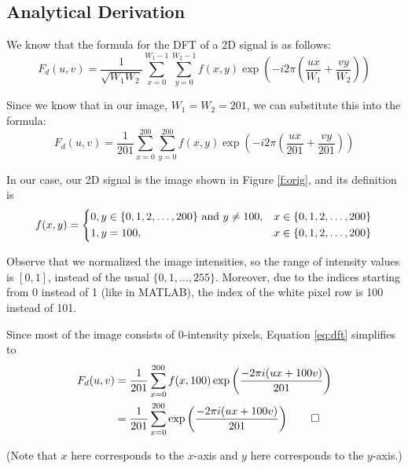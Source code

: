 \documentclass[a4paper]{article}
\begin{document}
\subsection{Analytical Derivation}

We know that the formula for the DFT of a 2D signal is as follows:
\begin{equation*}
F_d(u, v) = \dfrac{1}{\sqrt{W_1W_2}} \sum\limits_{x = 0}^{W_1 - 1} \sum\limits_{y = 0}^{W_2 - 1} f(x, y) \exp\left (-i2\pi \left (\dfrac{ux}{W_1} + \dfrac{vy}{W_2}\right )\right )
\end{equation*}

Since we know that in our image, $W_1 = W_2 = 201$, we can substitute this into the formula:
\begin{equation}
F_d(u, v) = \dfrac{1}{201} \sum\limits_{x = 0}^{200} \sum\limits_{y = 0}^{200} f(x, y) \exp\left (-i2\pi \left (\dfrac{ux}{201} + \dfrac{vy}{201}\right )\right )
\label{eq:dft}
\end{equation}

In our case, our 2D signal is the image shown in Figure \ref{f:orig}, and its definition is
\begin{equation*}
f(x, y) =
\begin{dcases}
0, y \in \{0, 1, 2, \dots, 200\} \text{ and } y \ne 100, & x \in \{0, 1, 2, \dots, 200\} \\
1, y = 100, & x \in \{0, 1, 2, \dots, 200\}
\end{dcases}
\end{equation*}

Observe that we normalized the image intensities, so the range of intensity values is $[0, 1]$, instead of the usual $\{0, 1, \dots, 255\}$. Moreover, due to the indices starting from 0 instead of 1 (like in MATLAB), the index of the white pixel row is 100 instead of 101.

\medskip

Since most of the image consists of 0-intensity pixels, Equation \eqref{eq:dft} simplifies to
\begin{align}
F_d(u, v) &= \dfrac{1}{201} \sum\limits_{x = 0}^{200} f(x, 100) \exp\left (\dfrac{-2\pi i(ux + 100v)}{201}\right ) \nonumber \\
&= \dfrac{1}{201} \sum\limits_{x = 0}^{200} \exp\left (\dfrac{-2\pi i(ux + 100v)}{201}\right ) \qed
\label{eq:final}
\end{align}

(Note that $x$ here corresponds to the $x$-axis and $y$ here corresponds to the $y$-axis.)
\end{document}
